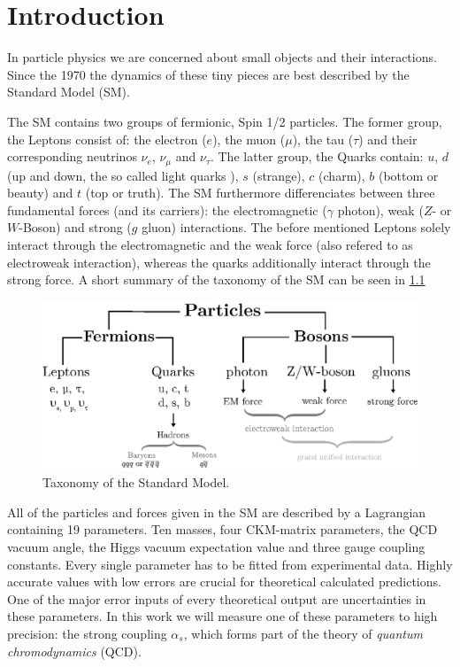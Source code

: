 \documentclass[../../index.tex]{subfiles}
\begin{document}
\chapter{Introduction}
In particle physics we are concerned about small objects and their interactions.
Since the 1970 the dynamics of these tiny pieces are best described by the Standard Model (SM).

The SM contains two groups of fermionic, Spin 1/2 particles. The former group,
the Leptons consist of: the electron ($e$), the muon ($\mu$), the tau ($\tau$)
and their corresponding neutrinos $\nu_e$, $\nu_\mu$ and $\nu_\tau$. The latter
group, the Quarks contain: $u$, $d$ (up and down, the so called light quarks ),
$s$ (strange), $c$ (charm), $b$ (bottom or beauty) and $t$ (top or truth). The SM
furthermore differenciates between three fundamental forces (and its carriers):
the electromagnetic ($\gamma$ photon), weak ($Z$- or $W$-Boson) and strong ($g$
gluon) interactions. The before mentioned Leptons solely interact through the
electromagnetic and the weak force (also refered to as electroweak interaction),
whereas the quarks additionally interact through the strong force. A short
summary of the taxonomy of the SM can be seen in \cref{fig:SMTaxonomy}
\begin{figure}
  \centering
  \includegraphics[width=\textwidth]{./images/standardModelTaxonomy.eps}
  \caption{Taxonomy of the Standard Model.}
  \label{fig:SMTaxonomy}
\end{figure}

All of the particles and forces given in the SM are described by a Lagrangian
containing 19 parameters. Ten masses, four CKM-matrix parameters, the QCD vacuum
angle, the Higgs vacuum expectation value and three gauge coupling constants.
Every single parameter has to be fitted from experimental data. Highly accurate
values with low errors are crucial for theoretical calculated predictions. One
of the major error inputs of every theoretical output are uncertainties in these
parameters. In this work we will measure one of these parameters to high
precision: the strong coupling $\alpha_s$, which forms part of the theory of
\textit{quantum chromodynamics} (QCD).
\end{document}
